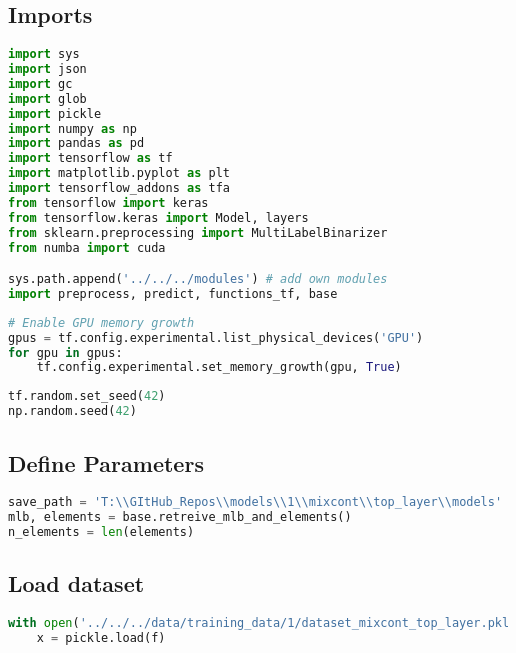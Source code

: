 \hypertarget{imports}{%
\subsection*{Imports}\label{imports}}

\begin{lstlisting}[language=Python]
import sys
import json
import gc
import glob
import pickle
import numpy as np
import pandas as pd
import tensorflow as tf
import matplotlib.pyplot as plt
import tensorflow_addons as tfa
from tensorflow import keras
from tensorflow.keras import Model, layers
from sklearn.preprocessing import MultiLabelBinarizer
from numba import cuda

sys.path.append('../../../modules') # add own modules
import preprocess, predict, functions_tf, base
\end{lstlisting}

\begin{lstlisting}[language=Python]
# Enable GPU memory growth
gpus = tf.config.experimental.list_physical_devices('GPU')
for gpu in gpus:
    tf.config.experimental.set_memory_growth(gpu, True)
\end{lstlisting}

\begin{lstlisting}[language=Python]
tf.random.set_seed(42)
np.random.seed(42)
\end{lstlisting}

\hypertarget{define-parameters}{%
\subsection*{Define Parameters}\label{define-parameters}}

\begin{lstlisting}[language=Python]
save_path = 'T:\\GItHub_Repos\\models\\1\\mixcont\\top_layer\\models'
mlb, elements = base.retreive_mlb_and_elements()
n_elements = len(elements)
\end{lstlisting}

\hypertarget{load-dataset}{%
\subsection*{Load dataset}\label{load-dataset}}

\begin{lstlisting}[language=Python]
with open('../../../data/training_data/1/dataset_mixcont_top_layer.pkl', 'rb') as f:
    x = pickle.load(f)
\end{lstlisting}

